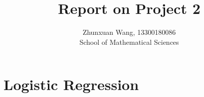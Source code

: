 \documentclass[10pt]{article}
\begin{document}
 
 
\title{\textbf{Report on Project 2}}%
\author{Zhunxuan Wang, 13300180086\\ %
School of Mathematical Sciences} %

\maketitle
\section{Logistic Regression}
\end{document}
